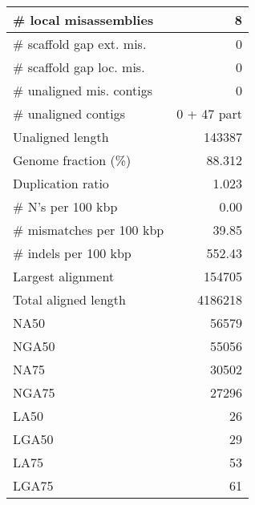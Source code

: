 \documentclass[12pt,a4paper]{article}
\begin{document}
\begin{table}[ht]
\begin{center}
\begin{tabular}{|l*{1}{|r}|}
\# local misassemblies & 8 \\ \hline
\# scaffold gap ext. mis. & 0 \\ \hline
\# scaffold gap loc. mis. & 0 \\ \hline
\# unaligned mis. contigs & 0 \\ \hline
\# unaligned contigs & 0 + 47 part \\ \hline
Unaligned length & 143387 \\ \hline
Genome fraction (\%) & 88.312 \\ \hline
Duplication ratio & 1.023 \\ \hline
\# N's per 100 kbp & 0.00 \\ \hline
\# mismatches per 100 kbp & 39.85 \\ \hline
\# indels per 100 kbp & 552.43 \\ \hline
Largest alignment & 154705 \\ \hline
Total aligned length & 4186218 \\ \hline
NA50 & 56579 \\ \hline
NGA50 & 55056 \\ \hline
NA75 & 30502 \\ \hline
NGA75 & 27296 \\ \hline
LA50 & 26 \\ \hline
LGA50 & 29 \\ \hline
LA75 & 53 \\ \hline
LGA75 & 61 \\ \hline
\end{tabular}
\end{center}
\end{table}
\end{document}
